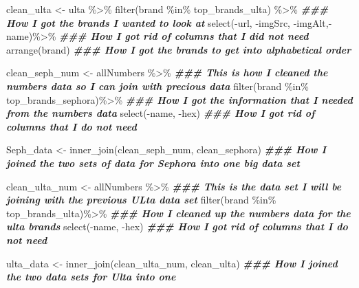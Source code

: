 \documentclass[
]{article}
\newenvironment{Shaded}{\begin{snugshade}}{\end{snugshade}}
\newcommand{\DocumentationTok}[1]{\textcolor[rgb]{0.56,0.35,0.01}{\textbf{\textit{#1}}}}
\newcommand{\FunctionTok}[1]{\textcolor[rgb]{0.00,0.00,0.00}{#1}}
\newcommand{\NormalTok}[1]{#1}
\newcommand{\OtherTok}[1]{\textcolor[rgb]{0.56,0.35,0.01}{#1}}
\newcommand{\SpecialCharTok}[1]{\textcolor[rgb]{0.00,0.00,0.00}{#1}}
\begin{document}
\begin{Shaded}
\begin{Highlighting}[]
\NormalTok{clean\_ulta }\OtherTok{\textless{}{-}}\NormalTok{ ulta }\SpecialCharTok{\%\textgreater{}\%}
  \FunctionTok{filter}\NormalTok{(brand }\SpecialCharTok{\%in\%}\NormalTok{ top\_brands\_ulta) }\SpecialCharTok{\%\textgreater{}\%}                \DocumentationTok{\#\#\# How I got the brands I wanted to look at }
  \FunctionTok{select}\NormalTok{(}\SpecialCharTok{{-}}\NormalTok{url, }\SpecialCharTok{{-}}\NormalTok{imgSrc, }\SpecialCharTok{{-}}\NormalTok{imgAlt,}\SpecialCharTok{{-}}\NormalTok{name)}\SpecialCharTok{\%\textgreater{}\%}               \DocumentationTok{\#\#\# How I got rid of columns that I did not need}
  \FunctionTok{arrange}\NormalTok{(brand)                                        }\DocumentationTok{\#\#\# How I got the brands to get into alphabetical order}

\NormalTok{clean\_seph\_num }\OtherTok{\textless{}{-}}\NormalTok{ allNumbers }\SpecialCharTok{\%\textgreater{}\%}                        \DocumentationTok{\#\#\# This is how I cleaned the numbers data so I can join with precious data}
  \FunctionTok{filter}\NormalTok{(brand }\SpecialCharTok{\%in\%}\NormalTok{ top\_brands\_sephora)}\SpecialCharTok{\%\textgreater{}\%}              \DocumentationTok{\#\#\# How I got the information that I needed from the numbers data}
  \FunctionTok{select}\NormalTok{(}\SpecialCharTok{{-}}\NormalTok{name, }\SpecialCharTok{{-}}\NormalTok{hex)                                   }\DocumentationTok{\#\#\# How I got rid of columns that I do not need}

\NormalTok{Seph\_data }\OtherTok{\textless{}{-}} \FunctionTok{inner\_join}\NormalTok{(clean\_seph\_num, clean\_sephora)  }\DocumentationTok{\#\#\# How I joined the two sets of data for Sephora into one big data set}

\NormalTok{clean\_ulta\_num }\OtherTok{\textless{}{-}}\NormalTok{ allNumbers }\SpecialCharTok{\%\textgreater{}\%}                        \DocumentationTok{\#\#\# This is the data set I will be joining with the previous ULta data set}
  \FunctionTok{filter}\NormalTok{(brand }\SpecialCharTok{\%in\%}\NormalTok{ top\_brands\_ulta)}\SpecialCharTok{\%\textgreater{}\%}                 \DocumentationTok{\#\#\# How I cleaned up the numbers data for the ulta brands}
  \FunctionTok{select}\NormalTok{(}\SpecialCharTok{{-}}\NormalTok{name, }\SpecialCharTok{{-}}\NormalTok{hex)                                   }\DocumentationTok{\#\#\# How I got rid of columns that I do not need}

\NormalTok{ulta\_data }\OtherTok{\textless{}{-}} \FunctionTok{inner\_join}\NormalTok{(clean\_ulta\_num, clean\_ulta)     }\DocumentationTok{\#\#\# How I joined the two data sets for Ulta into one }
\end{Highlighting}
\end{Shaded}
\end{document}
